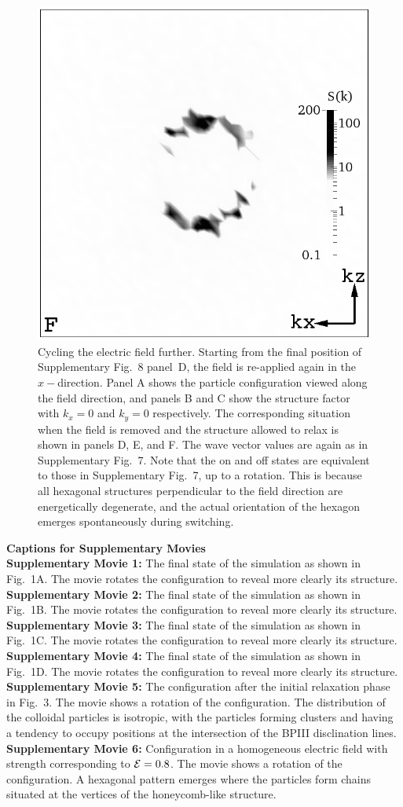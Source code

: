 \documentclass[12pt,twoside]{article}
\begin{document}
\begin{figure}[!h]
\begin{center}
\includegraphics[width=0.32\columnwidth]{sq_y_run1347.png}
\end{center}
\caption{Cycling the electric field further. Starting from the final
position of Supplementary Fig.~8 panel~D, the field is re-applied
again in the $x-$direction. Panel A shows the particle configuration
viewed along the field direction, and panels B and C show the structure
factor with $k_x = 0$ and $k_y = 0$ respectively. The corresponding
situation when the field is removed and the structure allowed to relax
is shown in panels D, E, and F. The wave vector values are again as
in Supplementary Fig.~7. Note that the on and off states are 
equivalent to those in Supplementary Fig.~7, up to a rotation.
This is because all hexagonal structures perpendicular to the field
direction are energetically degenerate,
and the actual orientation of the hexagon emerges spontaneously during
switching. }
\end{figure}

\clearpage
 
{\bf Captions for Supplementary Movies} \\

{\bf Supplementary Movie 1:} 
The final state of the simulation as shown in Fig.~1A. The movie
rotates the configuration to reveal more clearly its structure.\\

{\bf Supplementary Movie 2:} 
The final state of the simulation as shown in Fig.~1B. The movie
rotates the configuration to reveal more clearly its structure.\\


{\bf Supplementary Movie 3:} 
The final state of the simulation as shown in Fig.~1C. The movie
rotates the configuration to reveal more clearly its structure.\\


{\bf Supplementary Movie 4:} 
The final state of the simulation as shown in Fig.~1D. The movie
rotates the configuration to reveal more clearly its structure.\\


{\bf Supplementary Movie 5:} 
The configuration after the initial relaxation phase in Fig.~3. The movie
shows a rotation of the configuration. The distribution of the colloidal
particles is isotropic, with the particles forming clusters and having a
tendency to occupy positions at the intersection of the BPIII disclination
lines.\\

{\bf Supplementary Movie 6:} 
Configuration in a homogeneous electric field with strength
corresponding to ${\cal E}=0.8$. The movie
shows a rotation of the configuration.
A hexagonal pattern emerges where the particles form chains
situated at the vertices of the honeycomb-like structure. \\
\end{document}
